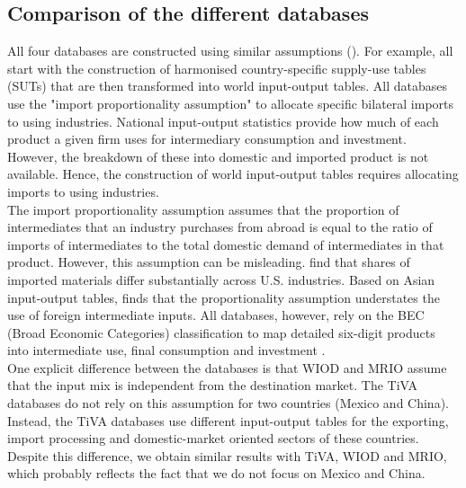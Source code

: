 \documentclass[11pt,a4paper]{paper} %
\begin{document}
\subsection{Comparison of the different databases}
All four databases are constructed using similar assumptions (\cite{OECD2011,Timmer2015,OECD2018}).
For example, all start with the construction of harmonised country-specific supply-use tables (SUTs) that are then transformed into world input-output tables.
All databases use the "import proportionality assumption" to allocate specific bilateral imports to using industries.
National input-output statistics provide how much of each product a given firm uses for intermediary consumption and investment. 
However, the breakdown of these into domestic and imported product is not available. 
Hence, the construction of world input-output tables requires allocating imports to using industries.\\
The import proportionality assumption assumes that the proportion of intermediates that an industry purchases from abroad is equal to the ratio of imports of intermediates to the total domestic demand of intermediates in that product. 
However, this assumption can be misleading. \cite{Feenstra2012} find that shares of imported materials differ substantially across U.S. industries. Based on Asian input-output tables, \cite{Puzzello2012} finds that the proportionality assumption understates the use of foreign intermediate inputs. All databases, however, rely on the BEC (Broad Economic Categories) classification to map detailed six-digit products into intermediate use, final consumption and investment \citep{Dietzenbacher2013}. \\
One explicit difference between the databases is that WIOD and MRIO assume that the input mix is independent from the destination market. 
The TiVA databases do not rely on this assumption for two countries (Mexico and China). Instead, the TiVA databases use different input-output tables for the exporting, import processing and domestic-market oriented sectors of these countries. Despite this difference, we obtain similar results with TiVA, WIOD and MRIO, which probably reflects the fact that we do not focus on Mexico and China.\\
\end{document}
